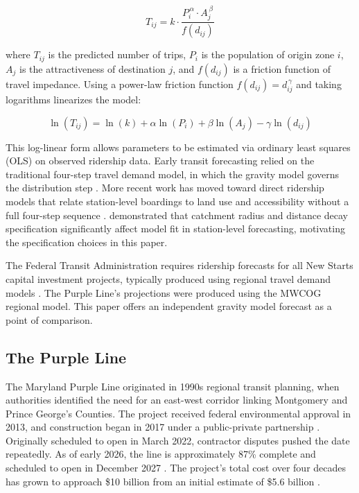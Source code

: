 \documentclass[11pt]{article}
\newcommand{\Tij}{T_{ij}}
\newcommand{\dij}{d_{ij}}
\begin{document}
\begin{equation}
    \Tij = k \cdot \frac{P_i^{\,\alpha} \cdot A_j^{\,\beta}}{f(\dij)}
    \label{eq:gravity}
\end{equation}

\noindent where $\Tij$ is the predicted number of trips, $P_i$ is the
population of origin zone $i$, $A_j$ is the attractiveness of destination
$j$, and $f(\dij)$ is a friction function of travel impedance. Using a
power-law friction function $f(\dij) = d_{ij}^{\,\gamma}$ and taking
logarithms linearizes the model:

\begin{equation}
    \ln(\Tij) = \ln(k) + \alpha \ln(P_i) + \beta \ln(A_j)
                - \gamma \ln(\dij)
    \label{eq:gravity_linear}
\end{equation}

This log-linear form allows parameters to be estimated via ordinary least
squares (OLS) on observed ridership data. Early transit forecasting relied on
the traditional four-step travel demand model, in which the gravity model
governs the distribution step \citep{niatt2008}. More recent work has moved
toward direct ridership models that relate station-level boardings to land
use and accessibility without a full four-step sequence \citep{cardozo2012}.
\citet{cardozo2012} demonstrated that catchment radius and distance decay
specification significantly affect model fit in station-level forecasting,
motivating the specification choices in this paper.

The Federal Transit Administration requires ridership forecasts for all New
Starts capital investment projects, typically produced using regional travel
demand models \citep{soundtransit2015}. The Purple Line's projections were
produced using the MWCOG regional model. This paper offers an independent
gravity model forecast as a point of comparison.

\subsection{The Purple Line}

The Maryland Purple Line originated in 1990s regional transit planning, when
authorities identified the need for an east-west corridor linking Montgomery
and Prince George's Counties. The project received federal environmental
approval in 2013, and construction began in 2017 under a public-private
partnership \citep{purplelinefeis}. Originally scheduled to open in March
2022, contractor disputes pushed the date repeatedly. As of early 2026, the
line is approximately 87\% complete and scheduled to open in December 2027
\citep{wjla2026}. The project's total cost over four decades has grown to
approach \$10 billion from an initial estimate of \$5.6 billion
\citep{bethesdamag2025}.
\end{document}
